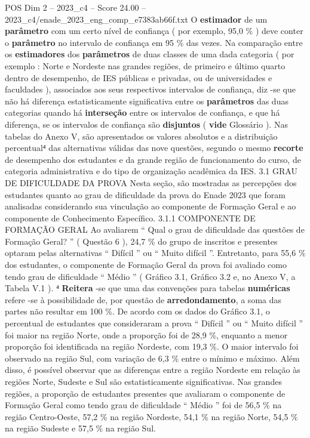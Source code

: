 \begin{textsample}{POS Dim 2 – 2023\_c4 – Score 24.00 – 2023\_c4/enade\_2023\_eng\_comp\_e7383ab66f.txt}
O \textbf{estimador} de um \textbf{parâmetro} com um certo nível de confiança ( por exemplo, 95,0 \% ) deve conter o \textbf{parâmetro} no intervalo de confiança em 95 \% das vezes.
Na comparação entre os \textbf{estimadores} dos \textbf{parâmetros} de duas classes de uma dada categoria ( por exemplo : Norte e Nordeste nas grandes regiões, de primeiro e último quarto dentro de desempenho, de IES públicas e privadas, ou de universidades e faculdades ), associados aos seus respectivos intervalos de confiança, diz -se que não há diferença estatisticamente significativa entre os \textbf{parâmetros} das duas categorias quando há \textbf{interseção} entre os intervalos de confiança, e que há diferença, se os intervalos de confiança são \textbf{disjuntos} ( \textbf{vide} Glossário ).
Nas tabelas do Anexo V, são apresentados os valores absolutos e a distribuição percentual⁴ das alternativas válidas das nove questões, segundo o mesmo \textbf{recorte} de desempenho dos estudantes e da grande região de funcionamento do curso, de categoria administrativa e do tipo de organização acadêmica da IES. 3.1 GRAU DE DIFICULDADE DA PROVA Nesta seção, são mostradas as percepções dos estudantes quanto ao grau de dificuldade da prova do Enade 2023 que foram analisadas considerando sua vinculação ao componente de Formação Geral e ao componente de Conhecimento Específico. 3.1.1 COMPONENTE DE FORMAÇÃO GERAL Ao avaliarem “ Qual o grau de dificuldade das questões de Formação Geral? ” ( Questão 6 ), 24,7 \% do grupo de inscritos e presentes optaram pelas alternativas “ Difícil ” ou “ Muito difícil ”.
Entretanto, para 55,6 \% dos estudantes, o componente de Formação Geral da prova foi avaliado como tendo grau de dificuldade “ Médio ” ( Gráfico 3.1, Gráfico 3.2 e, no Anexo V, a Tabela V.1 ). ⁴ \textbf{Reitera} -se que uma das convenções para tabelas \textbf{numéricas} refere -se à possibilidade de, por questão de \textbf{arredondamento}, a soma das partes não resultar em 100 \%.
De acordo com os dados do Gráfico 3.1, o percentual de estudantes que consideraram a prova “ Difícil ” ou “ Muito difícil ” foi maior na região Norte, onde a proporção foi de 28,9 \%, enquanto a menor proporção foi identificada na região Nordeste, com 19,3 \%.
O maior intervalo foi observado na região Sul, com variação de 6,3 \% entre o mínimo e máximo.
Além disso, é possível observar que as diferenças entre a região Nordeste em relação às regiões Norte, Sudeste e Sul são estatisticamente significativas.
Nas grandes regiões, a proporção de estudantes presentes que avaliaram o componente de Formação Geral como tendo grau de dificuldade “ Médio ” foi de 56,5 \% na região Centro-Oeste, 57,2 \% na região Nordeste, 54,1 \% na região Norte, 54,5 \% na região Sudeste e 57,5 \% na região Sul.

\end{textsample}
